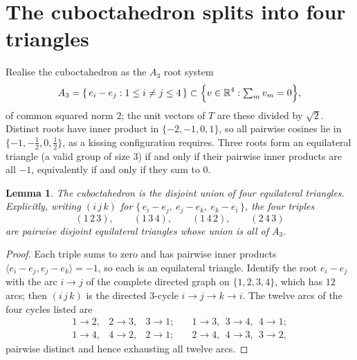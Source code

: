 \documentclass[11pt,reqno]{amsart}
\theoremstyle{plain}
\newtheorem{lemma}[theorem]{Lemma}
\theoremstyle{remark}
\newcommand{\R}{\mathbb{R}}
\newcommand{\ip}[2]{\langle #1, #2\rangle}
\begin{document}
\section{The cuboctahedron splits into four triangles}\label{sec:lemma}

Realise the cuboctahedron as the $A_{3}$ root system
\[
  A_{3} = \{\,e_{i}-e_{j} : 1 \le i \ne j \le 4\,\}
        \subset \Bigl\{v \in \R^{4} : \textstyle\sum_{m} v_{m} = 0\Bigr\},
\]
of common squared norm $2$; the unit vectors of $T$ are these divided by
$\sqrt2$.  Distinct roots have inner product in $\{-2,-1,0,1\}$, so all pairwise
cosines lie in $\{-1,-\tfrac12,0,\tfrac12\}$, as a kissing configuration
requires.  Three roots form an equilateral triangle (a valid group of size $3$)
if and only if their pairwise inner products are all $-1$, equivalently if and
only if they sum to $0$.

\begin{lemma}\label{lem:cubo}
The cuboctahedron is the disjoint union of four equilateral triangles.
Explicitly, writing $(i\,j\,k)$ for
$\{\,e_{i}-e_{j},\ e_{j}-e_{k},\ e_{k}-e_{i}\,\}$, the four triples
\[
  (1\,2\,3), \qquad (1\,3\,4), \qquad (1\,4\,2), \qquad (2\,4\,3)
\]
are pairwise disjoint equilateral triangles whose union is all of $A_{3}$.
\end{lemma}

\begin{proof}
Each triple sums to zero and has pairwise inner products
$\ip{e_{i}-e_{j}}{e_{j}-e_{k}} = -1$, so each is an equilateral triangle.
Identify the root $e_{i}-e_{j}$ with the arc $i \to j$ of the complete directed
graph on $\{1,2,3,4\}$, which has $12$ arcs; then $(i\,j\,k)$ is the directed
$3$-cycle $i \to j \to k \to i$.  The twelve arcs of the four cycles listed are
\[
  \begin{array}{llll}
    1\!\to\!2, & 2\!\to\!3, & 3\!\to\!1;\quad &
    1\!\to\!3, \ \ 3\!\to\!4, \ \ 4\!\to\!1; \\
    1\!\to\!4, & 4\!\to\!2, & 2\!\to\!1;\quad &
    2\!\to\!4, \ \ 4\!\to\!3, \ \ 3\!\to\!2,
  \end{array}
\]
pairwise distinct and hence exhausting all twelve arcs.
\end{proof}
\end{document}
